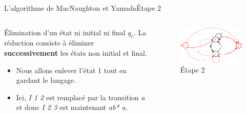 \documentclass{beamer}
\begin{document}
\begin{frame}{L'algorithme de MacNaughton et Yamada}{Étape 2}
     \begin{columns}[T]
     \begin{column}{.48\textwidth}
         {\fontsize{8}{9}\selectfont Élimination d’un état ni initial ni final \textit{$q_e$}.}
         {\fontsize{8}{9}\selectfont La réduction consiste à éliminer \textbf{successivement} les états non initial et final.}
         \begin{itemize}
         
             \item {\fontsize{7}{8}\selectfont Nous allons enlever l'état 1 tout en gardant le langage.}
             \item {\fontsize{7}{8}\selectfont Ici, \textit{I 1 2} est remplacé par la transition \textit{a} et donc \textit{I 2 3} est maintenant \textit{ab* a}.}
         \end{itemize}
     \end{column}
     
     \begin{column}{.48\textwidth}
     \begin{figure}
     \includegraphics[scale=0.37]{Diagramme3_2.png}
     \centering
     \caption{Étape 2}     
     \end{figure}
     \end{column}
        
     \end{columns}   

\end{frame}
\end{document}
